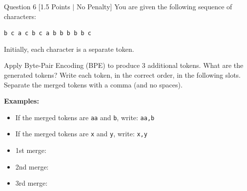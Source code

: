 \documentclass[11pt,a4paper]{article}
\begin{document}
\newpage
\begin{questionbox}{Question 6 \hfill [1.5 Points $\vert$ No Penalty]}
You are given the following sequence of characters:
\begin{center}
\texttt{b c a c b c a b b b b b c}
\end{center}
Initially, each character is a separate token.

Apply Byte-Pair Encoding (BPE) to produce 3 additional tokens. What are the generated tokens?
Write each token, in the correct order, in the following slots.
Separate the merged tokens with a comma (and no spaces).

\medskip
\textbf{Examples:}
\begin{itemize}[noitemsep]
    \item If the merged tokens are \texttt{aa} and \texttt{b}, write: \texttt{aa,b}
    \item If the merged tokens are \texttt{x} and \texttt{y}, write: \texttt{x,y}
\end{itemize}

\begin{itemize}
    \item 1st merge: \framebox[3cm]{\phantom{b,b}}
    \item 2nd merge: \framebox[3cm]{\phantom{b,c}}
    \item 3rd merge: \framebox[3cm]{\phantom{bc,a}}
\end{itemize}
\end{questionbox}

\bigskip
\end{document}
